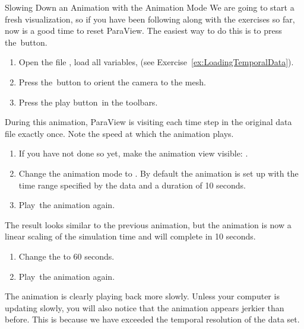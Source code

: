 \begin{exercise}{Slowing Down an Animation with the Animation Mode}%
  \label{ex:SlowingDownAnAnimation}%
  We are going to start a fresh visualization, so if you have been
  following along with the exercises so far, now is a good time to reset
  ParaView.  The easiest way to do this is to press the~\disconnect button.

  \begin{enumerate}
  \item Open the file , load all variables, \apply (see
    Exercise~\ref{ex:LoadingTemporalData}).
  \item Press the~\yPlus button to orient the camera to the mesh.
  \item Press the play button~\vcrPlay in the toolbars.
    \savecounter
  \end{enumerate}

  During this animation, ParaView is visiting each time step in the
  original data file exactly once.  Note the speed at which the animation
  plays.

  \begin{enumerate}
    \restorecounter
  \item If you have not done so yet, make the animation view visible:
     \ra {}.
  \item Change the animation mode to .  By default the
    animation is set up with the time range specified by the data and a
    duration of 10 seconds.
  \item Play~\vcrPlay the animation again.
    \savecounter
  \end{enumerate}

  The result looks similar to the previous 
  animation, but the animation is now a linear scaling of the simulation
  time and will complete in 10 seconds.

  \begin{enumerate}
    \restorecounter
  \item Change the  to 60 seconds.
  \item Play~\vcrPlay the animation again.
  \end{enumerate}

  The animation is clearly playing back more slowly.  Unless your computer
  is updating slowly, you will also notice that the animation appears
  jerkier than before.  This is because we have exceeded the temporal
  resolution of the data set.
\end{exercise}

